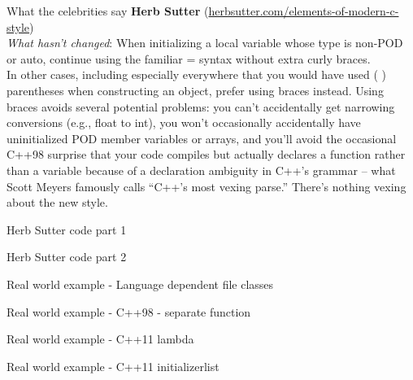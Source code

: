 \documentclass[11pt]{beamer}
\begin{document}
\begin{frame}{What the celebrities say}
\textbf{Herb Sutter} (\href{http://herbsutter.com/elements-of-modern-c-style}{herbsutter.com/elements-of-modern-c-style})\\

\emph{What hasn’t changed}: When initializing a local variable whose type is non-POD or auto, continue using the familiar = syntax without extra curly braces.\\
\pause
In other cases, including especially everywhere that you would have used ( ) parentheses when constructing an object, prefer using { } braces instead. Using braces avoids several potential problems: 
\pause
you can’t accidentally get narrowing conversions (e.g., float to int), 
\pause
you won’t occasionally accidentally have uninitialized POD member variables or arrays, 
\pause
and you’ll avoid the occasional C++98 surprise that your code compiles but actually declares a function rather than a variable because of a declaration ambiguity in C++’s grammar – what Scott Meyers famously calls “C++’s most vexing parse.” There’s nothing vexing about the new style.
\end{frame}

\begin{frame}{Herb Sutter code part 1}

\end{frame}

\begin{frame}{Herb Sutter code part 2}

\end{frame}

\begin{frame}{Real world example - Language dependent file classes}

\end{frame}

\begin{frame}{Real world example - C++98 - separate function}

\end{frame}

\begin{frame}{Real world example - C++11 lambda}

\end{frame}

\begin{frame}{Real world example - C++11 initializerlist}

\end{frame}
\end{document}
